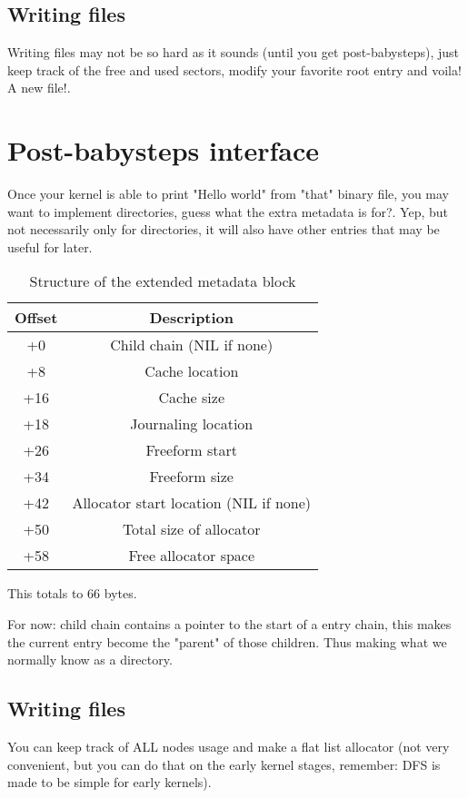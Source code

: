 \documentclass[12pt]{article}
\begin{document}
\subsection{Writing files}
Writing files may not be so hard as it sounds (until you get post-babysteps), just keep track of the free and used sectors, modify your favorite root entry and voila! A new file!.

\section{Post-babysteps interface}
Once your kernel is able to print "Hello world" from "that" binary file, you may want to implement directories, guess what the extra metadata is for?. Yep, but not necessarily only for directories, it will also have other entries that may be useful for later.

\begin{table}
\centering
\begin{tabular}{ |c|c| }
\hline
Offset & Description \\
\hline
+0 & Child chain (NIL if none) \\
+8 & Cache location \\
+16 & Cache size \\
+18 & Journaling location \\
+26 & Freeform start \\
+34 & Freeform size \\
+42 & Allocator start location (NIL if none) \\
+50 & Total size of allocator \\
+58 & Free allocator space \\
\hline
\end{tabular}
\caption{Structure of the extended metadata block}
\end{table}

This totals to 66 bytes.

For now: child chain contains a pointer to the start of a entry chain, this makes the current entry become the "parent" of those children. Thus making what we normally know as a directory.

\subsection{Writing files}
You can keep track of ALL nodes usage and make a flat list allocator (not very convenient, but you can do that on the early kernel stages, remember: DFS is made to be simple for early kernels).
\end{document}
